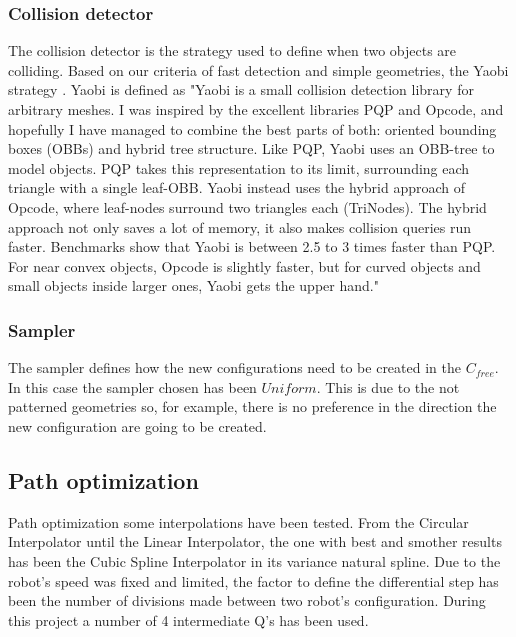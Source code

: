 	\subsubsection{Collision detector} %
	\label{sub:collision_detector}
	The collision detector is the strategy used to define when two objects are colliding. Based on our criteria of fast detection and simple geometries, the Yaobi strategy \cite{Yaobi}. Yaobi is defined as "Yaobi is a small collision detection library for arbitrary meshes. I was inspired by the excellent libraries PQP and Opcode, and hopefully I have managed to combine the best parts of both: oriented bounding boxes (OBBs) and hybrid tree structure. Like PQP, Yaobi uses an OBB-tree to model objects. PQP takes this representation to its limit, surrounding each triangle with a single leaf-OBB. Yaobi instead uses the hybrid approach of Opcode, where leaf-nodes surround two triangles each (TriNodes). The hybrid approach not only saves a lot of memory, it also makes collision queries run faster. Benchmarks show that Yaobi is between 2.5 to 3 times faster than PQP. For near convex objects, Opcode is slightly faster, but for curved objects and small objects inside larger ones, Yaobi gets the upper hand."
	\subsubsection{Sampler} %
	\label{sub:sampler}
	The sampler defines how the new configurations need to be created in the $C_{free}$. In this case the sampler chosen has been $Uniform$. This is due to the not patterned geometries so, for example, there is no preference in the direction the new configuration are going to be created.
\subsection{Path optimization} %
\label{sub:path_optimization_implementation}
Path optimization some interpolations have been tested. 
From the Circular Interpolator until the Linear Interpolator, the one with best and smother results has been the Cubic Spline Interpolator in its variance natural spline.
Due to the robot's speed was fixed and limited, the factor to define the differential step has been the number of divisions made between two robot's configuration. 
During this project a number of 4 intermediate Q's has been used.


